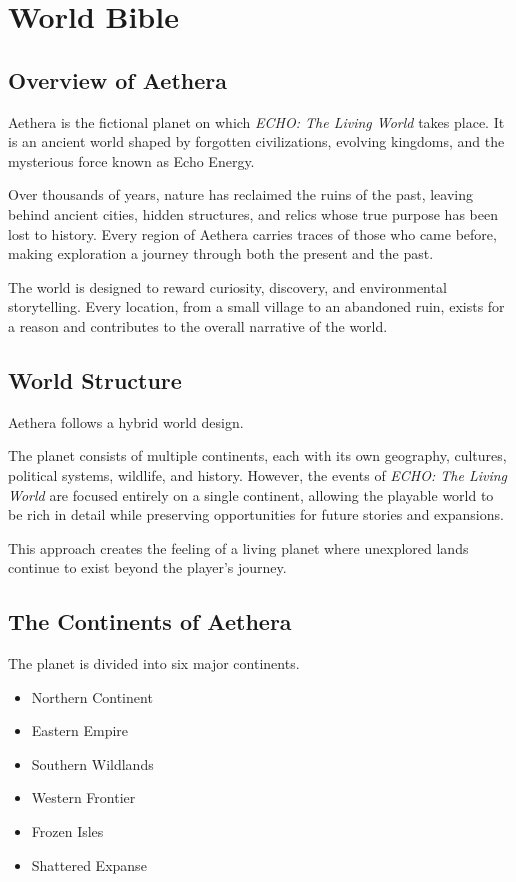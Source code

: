 \chapter{World Bible}

\section{Overview of Aethera}

Aethera is the fictional planet on which \textit{ECHO: The Living World} takes place. It is an ancient world shaped by forgotten civilizations, evolving kingdoms, and the mysterious force known as Echo Energy.

Over thousands of years, nature has reclaimed the ruins of the past, leaving behind ancient cities, hidden structures, and relics whose true purpose has been lost to history. Every region of Aethera carries traces of those who came before, making exploration a journey through both the present and the past.

The world is designed to reward curiosity, discovery, and environmental storytelling. Every location, from a small village to an abandoned ruin, exists for a reason and contributes to the overall narrative of the world.

\section{World Structure}

Aethera follows a hybrid world design.

The planet consists of multiple continents, each with its own geography, cultures, political systems, wildlife, and history. However, the events of \textit{ECHO: The Living World} are focused entirely on a single continent, allowing the playable world to be rich in detail while preserving opportunities for future stories and expansions.

This approach creates the feeling of a living planet where unexplored lands continue to exist beyond the player's journey.

\section{The Continents of Aethera}

The planet is divided into six major continents.

\begin{itemize}
    \item Northern Continent
    \item Eastern Empire
    \item Southern Wildlands
    \item Western Frontier
    \item Frozen Isles
    \item Shattered Expanse
\end{itemize}

